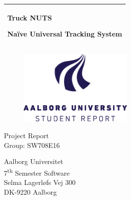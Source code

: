 %
\newcommand{\titlefont}{\sffamily\fontsize{36pt}{0pt}\selectfont}
\newcommand{\subtitlefont}{\sffamily\fontsize{26pt}{0pt}\selectfont}
\newcommand{\otherfont}{\sffamily\fontsize{18pt}{0pt}\selectfont}
\newcommand{\smallfont}{\sffamily\fontsize{12pt}{0pt}\selectfont}
\begin{titlepage}
  \addtolength{\hoffset}{0.5\evensidemargin-0.5\oddsidemargin} %
  \noindent%
  \begin{tabular}{@{}p{\textwidth}@{}}
    \toprule[2pt]
    \midrule
    \vspace{0.2cm}
    \begin{center}
		\titlefont Truck NUTS
    \end{center}
	\vspace{0.1cm}
    \begin{center}
		\subtitlefont Naïve Universal Tracking System
	\end{center}
    \vspace{0.2cm}\\
    \midrule
    \toprule[2pt]
  \end{tabular}
  \vspace{2 cm}
  \begin{figure}[h!]
    \centering
    \includegraphics[width=0.5\textwidth]{img/aau-logo-english.png}
  \end{figure}
  \vspace{3 cm}
  \begin{center}
    \otherfont
      Project Report
    \\
    \vspace{0.2cm}
    \otherfont
      Group: SW708E16
  \end{center}
  \vfill
  \begin{center}
  \smallfont
  Aalborg Universitet\\
  7\textsuperscript{th} Semester Software\\ \vspace{0.1cm}
  Selma Lagerløfs Vej 300\\
  DK-9220 Aalborg
  \end{center}
\end{titlepage}
\clearpage
\cleardoublepage
